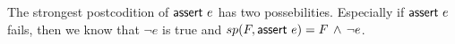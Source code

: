 \begin{enumerate}
\begin{itemize}
The strongest postcodition of $\kw{assert}\ e$ has two possebilities.
Especially if $\kw{assert}\ e$ fails, then we know that $\lnot e$ is true
and $sp(F,\mbox{\sffamily assert}\ e)=F\,\wedge \,\lnot e$.
\end{itemize}
\end{enumerate}












